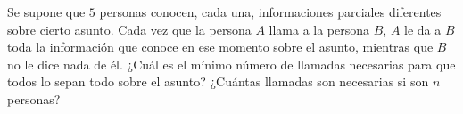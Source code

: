 Se supone que $5$ personas conocen, cada una, informaciones parciales diferentes sobre cierto asunto. Cada vez que la persona $A$ llama a la persona $B$, $A$ le da a $B$ toda la información que conoce en ese momento sobre el asunto, mientras que $B$ no le dice nada de él. ¿Cuál es el mínimo número de llamadas necesarias para que todos lo sepan todo sobre el asunto? ¿Cuántas llamadas son necesarias si son $n$ personas?
